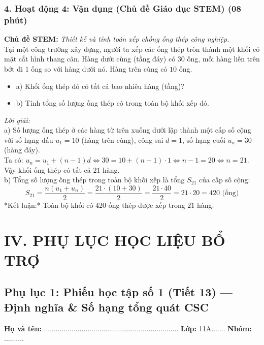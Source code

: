 \documentclass[12pt, a4paper]{article}
\begin{document}
\subsubsection*{4. Hoạt động 4: Vận dụng (Chủ đề Giáo dục STEM) (08 phút)}
\textbf{Chủ đề STEM:} \textit{Thiết kế và tính toán xếp chồng ống thép công nghiệp.}\\
Tại một công trường xây dựng, người ta xếp các ống thép tròn thành một khối có mặt cắt hình thang cân. Hàng dưới cùng (tầng đáy) có $30$ ống, mỗi hàng liền trên bớt đi $1$ ống so với hàng dưới nó. Hàng trên cùng có $10$ ống.
\begin{itemize}
    \item a) Khối ống thép đó có tất cả bao nhiêu hàng (tầng)?
    \item b) Tính tổng số lượng ống thép có trong toàn bộ khối xếp đó.
\end{itemize}
\textit{Lời giải:}\\
a) Số lượng ống thép ở các hàng từ trên xuống dưới lập thành một cấp số cộng với số hạng đầu $u_1 = 10$ (hàng trên cùng), công sai $d = 1$, số hạng cuối $u_n = 30$ (hàng đáy).\\
Ta có: $u_n = u_1 + (n - 1)d \iff 30 = 10 + (n - 1) \cdot 1 \iff n - 1 = 20 \iff n = 21$.\\
Vậy khối ống thép có tất cả $21$ hàng.\\
b) Tổng số lượng ống thép trong toàn bộ khối xếp là tổng $S_{21}$ của cấp số cộng:
$$S_{21} = \dfrac{n(u_1 + u_n)}{2} = \dfrac{21 \cdot (10 + 30)}{2} = \dfrac{21 \cdot 40}{2} = 21 \cdot 20 = 420\text{ (ống)}$$
*Kết luận:* Toàn bộ khối có $420$ ống thép được xếp trong $21$ hàng.


\newpage


\section*{IV. PHỤ LỤC HỌC LIỆU BỔ TRỢ}


\subsection*{Phụ lục 1: Phiếu học tập số 1 (Tiết 13) --- Định nghĩa \& Số hạng tổng quát CSC}
\noindent\textbf{Họ và tên:} .................................................................... \textbf{Lớp:} 11A....... \textbf{Nhóm:} ..........
\end{document}
